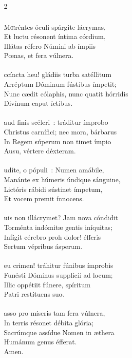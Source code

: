 \documentclass[9pt,twoside]{extarticle}
\begin{document}
\begin{multicols}{2}
\subsubsection*{\center {}}
\lettrine{M}œréntes óculi spárgite lácrymas,\\
Et luctu résonent íntima córdium,\\
Illátas réfero Númini ab ímpiis\\
Pœnas, et fera vúlnera.\\
\\
ccíncta heu! gládiis turba satéllitum\\
Arréptum Dóminum fústibus ímpetit;\\
Nunc cædit cólaphis, nunc quatit hórridis\\
Divínum caput íctibus.\\
\\
aud finis scéleri~: tráditur ímprobo\\
Christus carnífici; nec mora, bárbarus\\
In Regem súperum non timet ímpio\\
Ausu, vértere déxteram.\\
\\
udíte, o pópuli~: Numen amábile,\\
Manánte ex húmeris úndique sánguine,\\
Lictóris rábidi sústinet ímpetum,\\
Et vocem premit ínnocens.\\
\\
uis non illácrymet? Jam nova cóndidit\\
Torménta indómitæ gentis iníquitas;\\
Infígit cérebro proh dolor! éfferis\\
Sertum vépribus ásperum.\\
\\
eu crimen! tráhitur fúnibus ímprobis\\
Funésti Dóminus supplícii ad locum;\\
Illic oppétiit fúnere, spíritum\\
Patri restítuens suo.\\
\\
asso pro míseris tam fera vúlnera,\\
In terris résonet débita glória;\\
Sacrúmque assídue Nomen in æthera\\
Humánum genus éfferat.\\
Amen.


\end{multicols}
\end{document}
